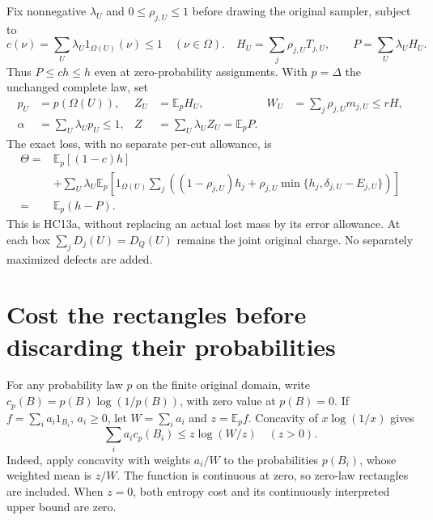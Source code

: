 \documentclass[11pt]{article}
\newcommand{\E}{\mathbb E}
\newcommand{\Om}{\Omega}
\begin{document}
Fix nonnegative $\lambda_U$ and $0\le\rho_{j,U}\le1$ before
drawing the original sampler, subject to
\[
 c(\nu)=\sum_U\lambda_U1_{\Om(U)}(\nu)\le1
                         \quad(\nu\in\Om).
 \quad
 H_U=\sum_j\rho_{j,U}T_{j,U},\qquad
 P=\sum_U\lambda_UH_U.                              \tag{HE2}
\]
Thus $P\le ch\le h$ even at zero-probability assignments.
With $p=\Delta$ the unchanged complete law, set
\[
 \begin{split}
 p_U&=p(\Om(U)),& Z_U&=\E_pH_U,&
 W_U&=\sum_j\rho_{j,U}m_{j,U}\le rH,\\
 \alpha&=\sum_U\lambda_Up_U\le1,&
 Z&=\sum_U\lambda_UZ_U=\E_pP .
 \end{split}                                                    \tag{HE3}
\]
The exact loss, with no separate per-cut allowance, is
\[
 \begin{split}
 \Theta={}&\E_p[(1-c)h]\\
 &+\sum_U\lambda_U\E_p\left[1_{\Om(U)}
   \sum_j\left((1-\rho_{j,U})h_j+
     \rho_{j,U}\min\{h_j,\delta_{j,U}-E_{j,U}\}\right)\right]\\
 ={}&\E_p(h-P).                                      \tag{HE4}
 \end{split}
\]
This is HC13a, without replacing an actual lost mass by its error
allowance. At each box $\sum_jD_j(U)=D_Q(U)$ remains the joint
original charge. No separately maximized defects are added.

\section{Cost the rectangles before discarding their probabilities}
For any probability law $p$ on the finite original domain, write
$c_p(B)=p(B)\log(1/p(B))$, with zero value at $p(B)=0$.
If $f=\sum_i a_i1_{B_i}$, $a_i\ge0$, let $W=\sum_i a_i$
and $z=\E_pf$. Concavity of $x\log(1/x)$ gives
\[
 \sum_i a_i c_p(B_i)\le z\log(W/z)\quad(z>0).          \tag{HE5}
\]
Indeed, apply concavity with weights $a_i/W$ to the probabilities
$p(B_i)$, whose weighted mean is $z/W$. The function is continuous
at zero, so zero-law rectangles are included. When $z=0$, both
entropy cost and its continuously interpreted upper bound are zero.
\end{document}
